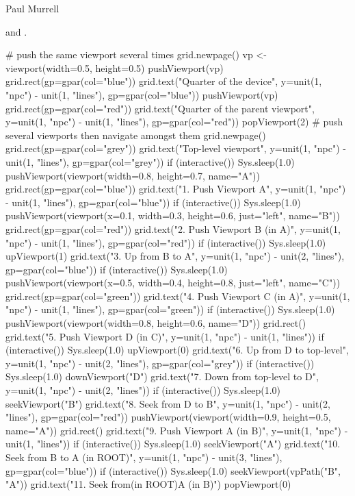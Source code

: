 %
\begin{Author}\relax
Paul Murrell
\end{Author}
%
\begin{SeeAlso}\relax
{} and .
\end{SeeAlso}
%
\begin{Examples}
\begin{ExampleCode}
# push the same viewport several times
grid.newpage()
vp <- viewport(width=0.5, height=0.5)
pushViewport(vp)
grid.rect(gp=gpar(col="blue"))
grid.text("Quarter of the device",
  y=unit(1, "npc") - unit(1, "lines"), gp=gpar(col="blue"))
pushViewport(vp)
grid.rect(gp=gpar(col="red"))
grid.text("Quarter of the parent viewport",
  y=unit(1, "npc") - unit(1, "lines"), gp=gpar(col="red"))
popViewport(2)
# push several viewports then navigate amongst them
grid.newpage()
grid.rect(gp=gpar(col="grey"))
grid.text("Top-level viewport",
  y=unit(1, "npc") - unit(1, "lines"), gp=gpar(col="grey"))
if (interactive()) Sys.sleep(1.0)
pushViewport(viewport(width=0.8, height=0.7, name="A"))
grid.rect(gp=gpar(col="blue"))
grid.text("1. Push Viewport A",
  y=unit(1, "npc") - unit(1, "lines"), gp=gpar(col="blue"))
if (interactive()) Sys.sleep(1.0)
pushViewport(viewport(x=0.1, width=0.3, height=0.6,
  just="left", name="B"))
grid.rect(gp=gpar(col="red"))
grid.text("2. Push Viewport B (in A)",
  y=unit(1, "npc") - unit(1, "lines"), gp=gpar(col="red"))
if (interactive()) Sys.sleep(1.0)
upViewport(1)
grid.text("3. Up from B to A",
  y=unit(1, "npc") - unit(2, "lines"), gp=gpar(col="blue"))
if (interactive()) Sys.sleep(1.0)
pushViewport(viewport(x=0.5, width=0.4, height=0.8,
  just="left", name="C"))
grid.rect(gp=gpar(col="green"))
grid.text("4. Push Viewport C (in A)",
  y=unit(1, "npc") - unit(1, "lines"), gp=gpar(col="green"))
if (interactive()) Sys.sleep(1.0)
pushViewport(viewport(width=0.8, height=0.6, name="D"))
grid.rect()
grid.text("5. Push Viewport D (in C)",
  y=unit(1, "npc") - unit(1, "lines"))
if (interactive()) Sys.sleep(1.0)
upViewport(0)
grid.text("6. Up from D to top-level",
  y=unit(1, "npc") - unit(2, "lines"), gp=gpar(col="grey"))
if (interactive()) Sys.sleep(1.0)
downViewport("D")
grid.text("7. Down from top-level to D",
  y=unit(1, "npc") - unit(2, "lines"))
if (interactive()) Sys.sleep(1.0)
seekViewport("B")
grid.text("8. Seek from D to B",
  y=unit(1, "npc") - unit(2, "lines"), gp=gpar(col="red"))
pushViewport(viewport(width=0.9, height=0.5, name="A"))
grid.rect()
grid.text("9. Push Viewport A (in B)",
  y=unit(1, "npc") - unit(1, "lines"))
if (interactive()) Sys.sleep(1.0)
seekViewport("A")
grid.text("10. Seek from B to A (in ROOT)",
  y=unit(1, "npc") - unit(3, "lines"), gp=gpar(col="blue"))
if (interactive()) Sys.sleep(1.0)
seekViewport(vpPath("B", "A"))
grid.text("11. Seek from\nA (in ROOT)\nto A (in B)")
popViewport(0)
\end{ExampleCode}
\end{Examples}
